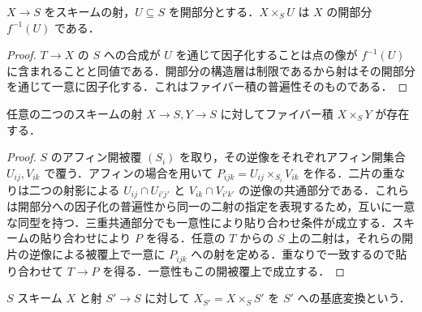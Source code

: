 \begin{prop}[開部分への基底変換]
$X\to S$ をスキームの射，$U\subseteq S$ を開部分とする．$X\times_S U$ は $X$ の開部分 $f^{-1}(U)$ である．
\end{prop}
\begin{proof}
$T\to X$ の $S$ への合成が $U$ を通じて因子化することは点の像が $f^{-1}(U)$ に含まれることと同値である．開部分の構造層は制限であるから射はその開部分を通じて一意に因子化する．これはファイバー積の普遍性そのものである．
\end{proof}
\begin{prop}[スキームのファイバー積の存在]
任意の二つのスキームの射 $X\to S,Y\to S$ に対してファイバー積 $X\times_S Y$ が存在する．
\end{prop}
\begin{proof}
$S$ のアフィン開被覆 $(S_i)$ を取り，その逆像をそれぞれアフィン開集合 $U_{ij},V_{ik}$ で覆う．アフィンの場合を用いて $P_{ijk}=U_{ij}\times_{S_i}V_{ik}$ を作る．二片の重なりは二つの射影による $U_{ij}\cap U_{i'j'}$ と $V_{ik}\cap V_{i'k'}$ の逆像の共通部分である．これらは開部分への因子化の普遍性から同一の二射の指定を表現するため，互いに一意な同型を持つ．三重共通部分でも一意性により貼り合わせ条件が成立する．スキームの貼り合わせにより $P$ を得る．任意の $T$ からの $S$ 上の二射は，それらの開片の逆像による被覆上で一意に $P_{ijk}$ への射を定める．重なりで一致するので貼り合わせて $T\to P$ を得る．一意性もこの開被覆上で成立する．
\end{proof}
\begin{defn}[基底変換]
$S$ スキーム $X$ と射 $S'\to S$ に対して $X_{S'}=X\times_S S'$ を $S'$ への基底変換という．
\end{defn}
